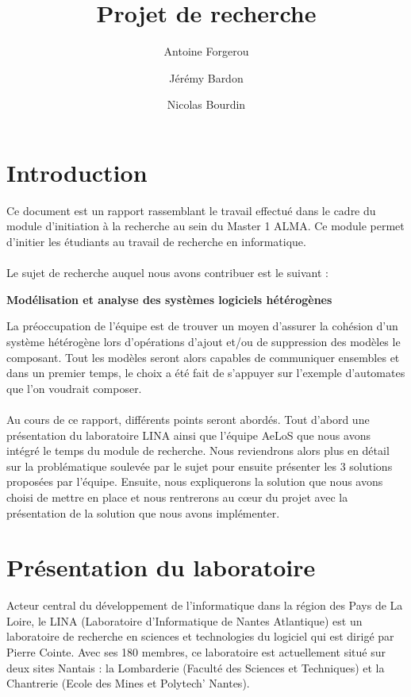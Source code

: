 \documentclass[12pt,a4paper]{report}
\title{Projet de recherche}
\author{Antoine Forgerou \and Jérémy Bardon \and Nicolas Bourdin}
\date{}
\begin{document}
	\renewcommand{\contentsname}{Sommaire}
	\maketitle	

	\tableofcontents	
	\newpage
	
	\setlength{\unitlength}{1cm}
	
	
\chapter{Introduction}
Ce document est un rapport rassemblant le travail effectué dans le cadre du module 
d'initiation à la recherche au sein du Master 1 ALMA. Ce module permet d'initier 
les étudiants au travail de recherche en informatique. 
\\\\
Le sujet de recherche auquel nous avons contribuer est le suivant : 

\begin{center}
	  \textbf{Modélisation et analyse des systèmes logiciels hétérogènes}
\end{center}

La préoccupation de l'équipe est de trouver un moyen d'assurer la cohésion d'un système
hétérogène lors d'opérations d'ajout et/ou de suppression des modèles le composant. 
Tout les modèles seront alors capables de communiquer ensembles et dans un premier temps, 
le choix a été fait de s'appuyer sur l'exemple d'automates que l'on voudrait composer.
\\\\
Au cours de ce rapport, différents points seront abordés. Tout d'abord une 
présentation du laboratoire LINA ainsi que l'équipe AeLoS que nous avons intégré le 
temps du module de recherche. Nous reviendrons alors plus en détail sur la 
problématique soulevée par le sujet pour ensuite présenter les 3 solutions proposées
par l'équipe. Ensuite, nous expliquerons la solution que nous avons choisi de mettre 
en place et nous rentrerons au cœur du projet avec la présentation de la solution
que nous avons implémenter.	

\chapter{Présentation du laboratoire}
Acteur central du développement de l'informatique dans la région des Pays de La Loire, le LINA (Laboratoire d'Informatique de Nantes Atlantique) est un laboratoire de recherche en sciences et technologies du logiciel qui est dirigé par Pierre Cointe. Avec ses 180 membres, ce laboratoire est actuellement situé sur deux sites Nantais : la Lombarderie (Faculté des Sciences et Techniques) et la Chantrerie (Ecole des Mines et Polytech' Nantes).
\end{document}
